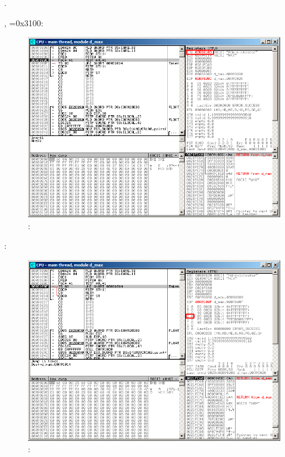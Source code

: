 \Czero {}.

\clearpage
\FNSTSW {}, =0x3100:

\begin{figure}[H]
\centering
\includegraphics[scale=\FigScale]{patterns/12_FPU/3_comparison/x86/MSVC_Ox/olly1_3.png}
\caption{\olly: \FNSTSW {}}
\label{fig:FPU_comparison_Ox_case1_olly3}
\end{figure}

\clearpage
\TEST {}:

\begin{figure}[H]
\centering
\includegraphics[scale=\FigScale]{patterns/12_FPU/3_comparison/x86/MSVC_Ox/olly1_4.png}
\caption{\olly: \TEST {}}
\label{fig:FPU_comparison_Ox_case1_olly4}
\end{figure}


